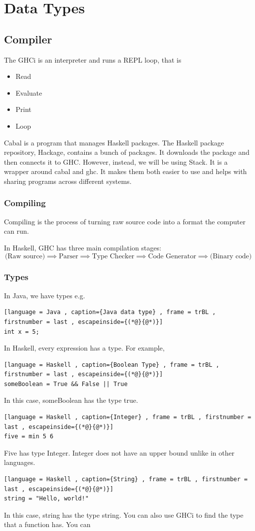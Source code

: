 \documentclass[a4paper]{article}
\theoremstyle{plain}
\theoremstyle{definition}
\newtheorem{defn}{Definition}[section]
\theoremstyle{remark}
\begin{document}
\section{Data Types}
\subsection{Compiler}
The GHCi is an interpreter and runs a REPL loop, that is
\begin{itemize}
	\item Read
	\item Evaluate
	\item Print
	\item Loop
\end{itemize}
Cabal is a program that manages Haskell packages. The Haskell package repository, Hackage, contains a bunch of packages. It downloads the package and then connects it to GHC. However, instead, we will be using Stack. It is a wrapper around cabal and ghc. It makes them both easier to use and helps with sharing programs across different systems. 
\subsubsection{Compiling}
\begin{tcolorbox}[colback=black!3!white,colframe=black!60!white,title=\begin{defn}Compiling \label{Compiling}\end{defn}]
Compiling is the process of turning raw source code into a format the computer can run.
\end{tcolorbox}
In Haskell, GHC has three main compilation stages:
\[
\text{(Raw source)} \implies \text{Parser} \implies \text{Type Checker} \implies \text{Code Generator} \implies \text{(Binary code)}
\] 
\subsubsection{Types}
In Java, we have types e.g.
\begin{lstlisting}[language = Java , caption={Java data type} , frame = trBL , firstnumber = last , escapeinside={(*@}{@*)}]
int x = 5;
\end{lstlisting}
In Haskell, every expression has a type. For example,
\begin{lstlisting}[language = Haskell , caption={Boolean Type} , frame = trBL , firstnumber = last , escapeinside={(*@}{@*)}]
someBoolean = True && False || True
\end{lstlisting}
In this case, someBoolean has the type true.
\begin{lstlisting}[language = Haskell , caption={Integer} , frame = trBL , firstnumber = last , escapeinside={(*@}{@*)}]
five = min 5 6
\end{lstlisting}
Five has type Integer. Integer does not have an upper bound unlike in other languages.
\begin{lstlisting}[language = Haskell , caption={String} , frame = trBL , firstnumber = last , escapeinside={(*@}{@*)}]
string = "Hello, world!"
\end{lstlisting}
In this case, string has the type string.
You can also use GHCi to find the type that a function has. You can
\end{document}
